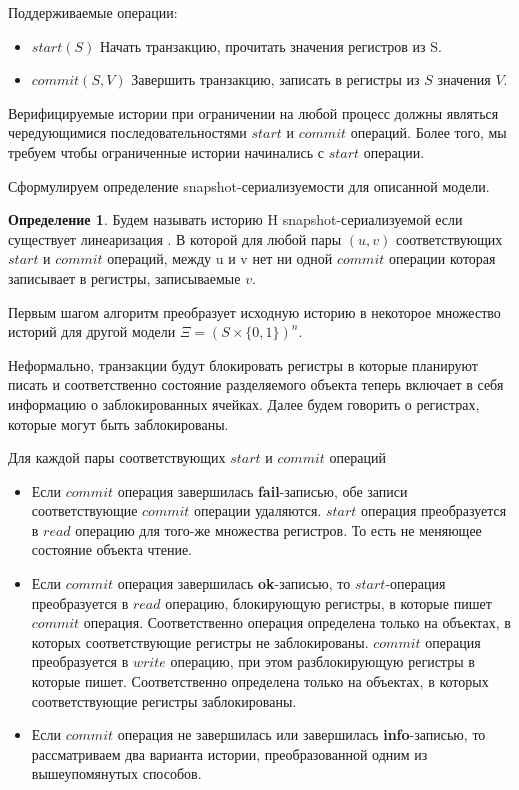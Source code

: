\documentclass[pdftex,ptm,14pt,a4paper]{extreport}
\theoremstyle{definition}
\newtheorem{definition}{Определение}[chapter]
\begin{document}
Поддерживаемые операции:
\begin{itemize}
    \item{$start(S)$} Начать транзакцию, прочитать значения регистров из S.
    \item{$commit(S, V)$} Завершить транзакцию, записать в регистры из $S$ значения $V$.
\end{itemize}

Верифицируемые истории при ограничении на любой процесс должны являться чередующимися последовательностями
$start$ и $commit$ операций. Более того, мы требуем чтобы ограниченные истории начинались с $start$ операции.

Сформулируем определение snapshot-сериализуемости для описанной модели.

\begin{definition}
    \label{snapshot-def}
    Будем называть историю H snapshot-сериализуемой если существует линеаризация \cite{linearizable}.
    В которой для любой пары $(u, v)$ соответствующих $start$ и $commit$ операций, между u и v нет ни одной
    $commit$ операции которая записывает в регистры, записываемые $v$.
\end{definition}

Первым шагом алгоритм преобразует исходную историю в некоторое множество историй для другой модели
$\Xi = (S\times\{0, 1\})^n.$

Неформально, транзакции будут блокировать регистры в которые планируют писать и соответственно
состояние разделяемого объекта теперь включает в себя информацию о заблокированных ячейках.
Далее будем говорить о регистрах, которые могут быть заблокированы.

Для каждой пары соответствующих $start$ и $commit$ операций
\begin{itemize}
    \item Если $commit$ операция завершилась \textbf{fail}-записью, обе записи
        соответствующие $commit$ операции удаляются.
        $start$ операция преобразуется в $read$ операцию для того-же множества регистров.
        То есть не меняющее состояние объекта чтение.
    \item Если $commit$ операция завершилась \textbf{ok}-записью, то
        $start$-операция преобразуется в $read$ операцию, блокирующую регистры,
        в которые пишет $commit$ операция. Соответственно операция определена только на объектах,
        в которых соответствующие регистры не заблокированы. $commit$ операция преобразуется в
        $write$ операцию, при этом разблокирующую регистры в которые пишет.
        Соответственно определена только на объектах, в которых соответствующие регистры заблокированы.
    \item Если $commit$ операция не завершилась или завершилась \textbf{info}-записью, то рассматриваем два варианта истории,
        преобразованной одним из вышеупомянутых способов.
\end{itemize}
\end{document}

